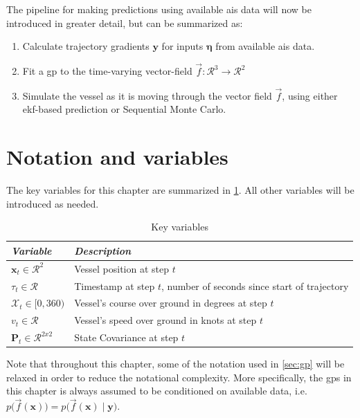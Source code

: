 The pipeline for making predictions using available \acrshort{ais} data will now be introduced in greater detail, but can be summarized as:
\begin{enumerate}
    \item Calculate trajectory gradients $\boldsymbol{y}$ for inputs $\boldsymbol{\eta}$ from available \acrshort{ais} data.
    \item Fit a \acrshort{gp} to the time-varying vector-field $\vec{f}: \mathcal{R}^3 \to \mathcal{R}^2$
    \item Simulate the vessel as it is moving through the vector field $\vec{f}$, using either \acrshort{ekf}-based prediction or Sequential Monte Carlo.
\end{enumerate}



\section{Notation and variables}
The key variables for this chapter are summarized in \cref{table:dyngp_key_variables}. All other variables will be introduced as needed.
\begin{table}[h]
    \centering
    \begin{tabular}{ll}
        \textit{\textbf{Variable}}               & \textit{\textbf{Description}}                                      \\ \hline
        $\boldsymbol{x}_t \in \mathcal{R}^2$     & Vessel position at step $t$               \\
        $\tau_t \in \mathcal{R}$                 & Timestamp at step $t$, number of seconds since start of trajectory \\
        $\mathcal{X}_t \in [0, 360)$             & Vessel's course over ground in degrees at step $t$                 \\
        $v_t \in \mathcal{R}$                    & Vessel's speed over ground in knots at step $t$                    \\
        $\boldsymbol{P}_t \in \mathcal{R}^{2x2}$ & State Covariance at step $t$                                       \\
    \end{tabular}
    \caption{Key variables}
    \label{table:dyngp_key_variables}
\end{table}

Note that throughout this chapter, some of the notation used in \cref{sec:gp} will be relaxed in order to reduce the notational complexity. More specifically, the \acrshort{gp}s in this chapter is always assumed to be conditioned on available data, i.e. $p\big(\vec{f}(\boldsymbol{x})\big) = p\big(\vec{f}(\boldsymbol{x}) \; | \; \boldsymbol{y} \big)$.
